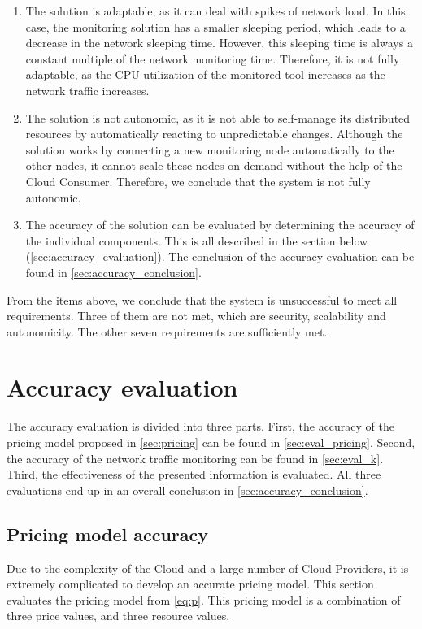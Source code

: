 \begin{enumerate}
    \item The solution is adaptable, as it can deal with spikes of network load. In this case, the monitoring solution has a smaller sleeping period, which leads to a decrease in the network sleeping time. However, this sleeping time is always a constant multiple of the network monitoring time. Therefore, it is not fully adaptable, as the CPU utilization of the monitored tool increases as the network traffic increases.
    \item The solution is not autonomic, as it is not able to self-manage its distributed resources by automatically reacting to unpredictable changes. Although the solution works by connecting a new monitoring node automatically to the other nodes, it cannot scale these nodes on-demand without the help of the Cloud Consumer. Therefore, we conclude that the system is not fully autonomic.
    \item The accuracy of the solution can be evaluated by determining the accuracy of the individual components. This is all described in the section below (\autoref{sec:accuracy_evaluation}). The conclusion of the accuracy evaluation can be found in \autoref{sec:accuracy_conclusion}.
\end{enumerate}

\noindent
From the items above, we conclude that the system is unsuccessful to meet all requirements. Three of them are not met, which are security, scalability and autonomicity. The other seven requirements are sufficiently met.

\section{Accuracy evaluation} \label{sec:accuracy_evaluation}
The accuracy evaluation is divided into three parts. First, the accuracy of the pricing model proposed in \autoref{sec:pricing} can be found in \autoref{sec:eval_pricing}. Second, the accuracy of the network traffic monitoring can be found in \autoref{sec:eval_k}. Third, the effectiveness of the presented information is evaluated. All three evaluations end up in an overall conclusion in \autoref{sec:accuracy_conclusion}.

\subsection{Pricing model accuracy} \label{sec:eval_pricing}
Due to the complexity of the Cloud and a large number of Cloud Providers, it is extremely complicated to develop an accurate pricing model. This section evaluates the pricing model from \autoref{eq:p}. This pricing model is a combination of three price values, and three resource values.\\

